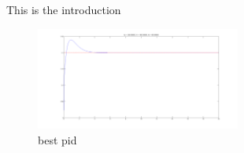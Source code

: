 This is the introduction

\begin{figure}[htp]
\center
\includegraphics[width=0.6\textwidth]{figures/pid_best}
\caption{best pid}
\label{fig:best_pid}
\end{figure}